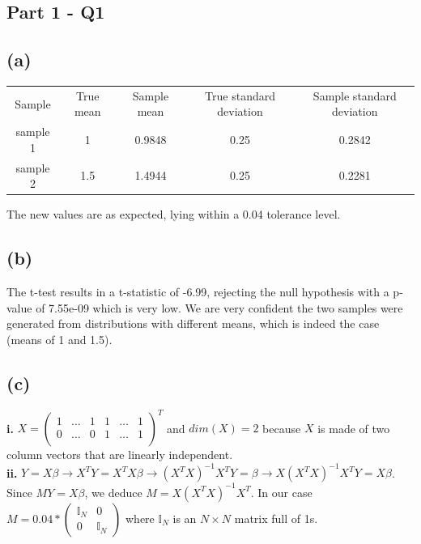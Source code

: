 \documentclass[12pt,a4paper,oneside]{report}
\begin{document}

\subsection*{Part 1 - Q1}
\subsection*{(a)}

\begin{center}
\begin{tabular}{c | c | c | c | c}
Sample & True mean & Sample mean & True standard deviation & Sample standard deviation\\
sample 1 & 1 & 0.9848 & 0.25 & 0.2842\\
sample 2 & 1.5 & 1.4944 & 0.25 & 0.2281\\
\end{tabular}
\end{center}

The new values are as expected, lying within a 0.04 tolerance level.

\subsection*{(b)}

The t-test results in a t-statistic of -6.99, rejecting the null hypothesis with a p-value of 7.55e-09 which is very low. We are very confident the two samples were generated from distributions with different means, which is indeed the case (means of 1 and 1.5).

\subsection*{(c)}

\textbf{i.} $X = \begin{pmatrix}
1 & \dots & 1 & 1 & \dots & 1\\
0 & \dots & 0 & 1 & \dots & 1\\

\end{pmatrix}^T$ and $dim(X) = 2$ because $X$ is made of two column vectors that are linearly independent.\\


\textbf{ii.} $Y = X\beta \to X^TY = X^TX\beta \to (X^TX)^{-1}X^TY = \beta \to X(X^TX)^{-1}X^TY = X\beta$. Since $MY = X\beta$, we deduce $M = X(X^TX)^{-1}X^T$. In our case $M = 
0.04 * \begin{pmatrix}
\mathbb{I}_N & 0\\
0 & \mathbb{I}_N
\end{pmatrix}
$
where $\mathbb{I}_N$ is an $N \times N$ matrix full of 1s.\\
                 
\end{document}

